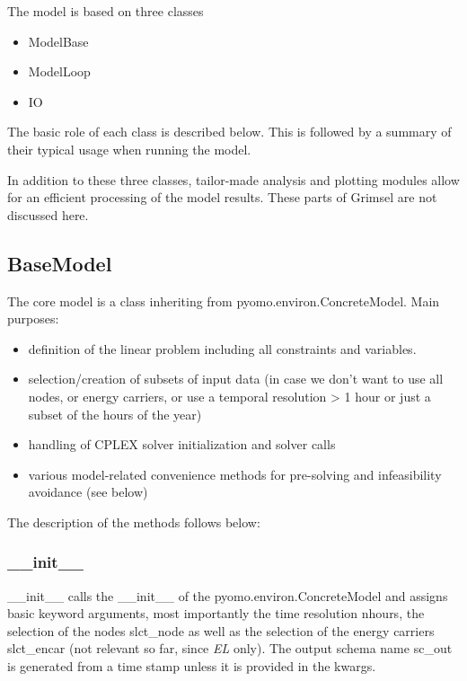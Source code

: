 \documentclass[]{article}
\begin{document}
The model is based on three classes

\begin{itemize}\itemsep1pt\parskip0pt
\item ModelBase
\item ModelLoop
\item IO
\end{itemize}

The basic role of each class is described below. This is followed by a
summary of their typical usage when running the model.

In addition to these three classes, tailor-made analysis and plotting
modules allow for an efficient processing of the model results. These
parts of Grimsel are not discussed here.

\subsection{BaseModel}\label{basemodel}

The core model is a class inheriting from pyomo.environ.ConcreteModel.
Main purposes:

\begin{itemize}
\itemsep1pt\parskip0pt
\item
  definition of the linear problem including all constraints and
  variables.
\item
  selection/creation of subsets of input data (in case we don't want to
  use all nodes, or energy carriers, or use a temporal resolution
  \textgreater{} 1 hour or just a subset of the hours of the year)
\item
  handling of CPLEX solver initialization and solver calls
\item
  various model-related convenience methods for pre-solving and
  infeasibility avoidance (see below)
\end{itemize}

The description of the methods follows below:

\subsubsection{\_\_init\_\_}\label{initux5fux5f}

\_\_init\_\_ calls the \_\_init\_\_ of the pyomo.environ.ConcreteModel
and assigns basic keyword arguments, most importantly the time
resolution nhours, the selection of the nodes slct\_node as well as the
selection of the energy carriers slct\_encar (not relevant so far, since
\emph{EL} only). The output schema name sc\_out is generated from a time stamp unless it is provided in the kwargs.
\end{document}
